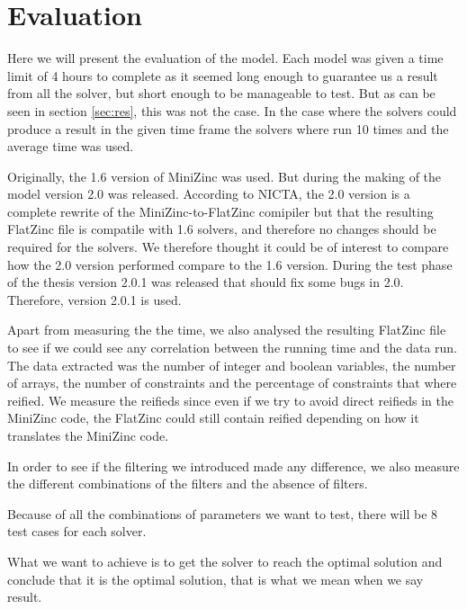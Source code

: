 \chapter{Evaluation}\label{cha:eval}
Here we will present the evaluation of the model. Each model was given a time limit of 4 hours to complete as it seemed long enough to guarantee us a result from all the solver, but short enough to be manageable to test. But as can be seen in section \ref{sec:res}, this was not the case. In the case where the solvers could produce a result in the given time frame the solvers where run 10 times and the average time was used.

Originally, the 1.6 version of MiniZinc was used. But during the making of the model version 2.0 was released. According to NICTA, the 2.0 version is a complete rewrite of the MiniZinc-to-FlatZinc comipiler but that the resulting FlatZinc file is compatile with 1.6 solvers, and therefore no changes should be required for the solvers.\cite{mz2} We therefore thought it could be of interest to compare how the 2.0 version performed compare to the 1.6 version. During the test phase of the thesis version 2.0.1 was released that should fix some bugs in 2.0.\cite{mz2_changelog} Therefore, version 2.0.1 is used.

Apart from measuring the the time, we also analysed the resulting FlatZinc file to see if we could see any correlation between the running time and the data run. The data extracted was the number of integer and boolean variables, the number of arrays, the number of constraints and the percentage of constraints that where reified. We measure the reifieds since even if we try to avoid direct reifieds in the MiniZinc code, the FlatZinc could still contain reified depending on how it translates the MiniZinc code.

In order to see if the filtering we introduced made any difference, we also measure the different combinations of the filters and the absence of filters.

Because of all the combinations of parameters we want to test, there will be 8 test cases for each solver.

What we want to achieve is to get the solver to reach the optimal solution and conclude that it is the optimal solution, that is what we mean when we say result.


